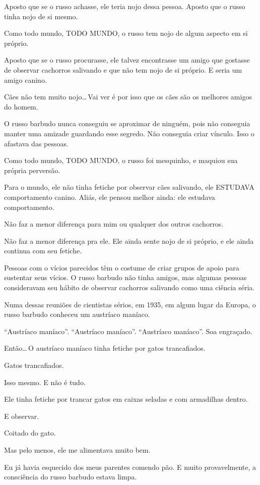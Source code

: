 Aposto que se o russo achasse, ele teria nojo dessa pessoa. Aposto que o russo tinha nojo de si mesmo.

Como todo mundo, TODO MUNDO, o russo tem nojo de algum aspecto em si próprio.

Aposto que se o russo procurasse, ele talvez encontrasse um amigo que gostasse de observar cachorros salivando e que não tem nojo de si próprio. E seria um amigo canino.

Cães não tem muito nojo\ldots\,Vai ver é por isso que os cães são os melhores amigos do homem.

O russo barbudo nunca conseguiu se aproximar de ninguém, pois não conseguia manter uma amizade guardando esse segredo. Não conseguia criar vínculo. Isso o afastava das pessoas.

Como todo mundo, TODO MUNDO, o russo foi mesquinho, e maquiou sua própria perversão.

Para o mundo, ele não tinha fetiche por observar cães salivando, ele ESTUDAVA comportamento canino. Aliás, ele pensou melhor ainda: ele estudava comportamento.

Não faz a menor diferença para mim ou qualquer dos outros cachorros.

Não faz a menor diferença pra ele. Ele ainda sente nojo de si próprio, e ele ainda continua com seu fetiche.

Pessoas com o vícios parecidos têm o costume de criar grupos de apoio para sustentar seus vícios. O russo barbudo não tinha amigos, mas algumas pessoas consideravam seu hábito de observar cachorros salivando como uma ciência séria.

Numa dessas reuniões de cientistas sérios, em 1935, em algum lugar da Europa, o russo barbudo conheceu um austríaco maníaco.

``Austríaco maníaco''. ``Austríaco maníaco''. ``Austríaco maníaco''. Soa engraçado.

Então\ldots\,O austríaco maníaco tinha fetiche por gatos trancafiados.

Gatos trancafiados.

Isso mesmo. E não é tudo.

Ele tinha fetiche por trancar gatos em caixas seladas e com armadilhas dentro.

E observar.

Coitado do gato.

Mas pelo menos, ele me alimentava muito bem.

Eu já havia esquecido dos meus parentes comendo pão. E muito provavelmente, a consciência do russo barbudo estava limpa.

